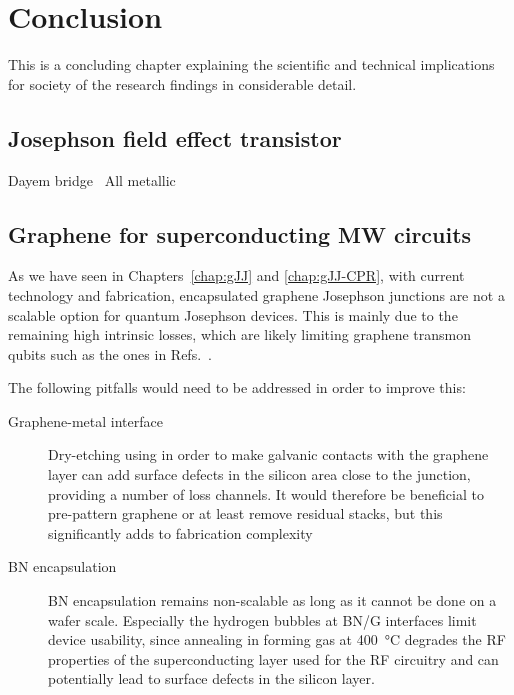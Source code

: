 \newchapstyle
\chapter{Conclusion}
\label{chap:conclusion}

\afterpage{\pagecolor{none}}\newpage
This is a concluding chapter explaining the scientific and technical
implications for society of the research findings in considerable detail.

\section{Josephson field effect transistor}

Dayem bridge~\cite{paolucciMagnetotransportExperimentsFully2019}
All metallic~\cite{desimoniMetallicSupercurrentFieldeffect2018}
\section{Graphene for superconducting MW circuits}

As we have seen in Chapters~\ref{chap:gJJ} and \ref{chap:gJJ-CPR}, with current technology and fabrication, encapsulated graphene Josephson junctions are not a scalable option for quantum Josephson devices.
%
This is mainly due to the remaining high intrinsic losses, which are likely limiting graphene transmon qubits such as the ones in Refs.~\cite{krollMagneticFieldCompatible2018,wangCoherentControlHybrid2019}.

The following pitfalls would need to be addressed in order to improve this:
\begin{description}
	\item[Graphene-metal interface] Dry-etching using  in order to make galvanic contacts with the graphene layer can add surface defects in the silicon area close to the junction, providing a number of loss channels.
	It would therefore be beneficial to pre-pattern graphene or at least remove residual stacks, but this significantly adds to fabrication complexity
	\item[BN encapsulation] BN encapsulation remains non-scalable as long as it cannot be done on a wafer scale.
	Especially the hydrogen bubbles at BN/G interfaces limit device usability, since annealing in forming gas at \SI{400}{\celsius} degrades the RF properties of the superconducting layer used for the RF circuitry and can potentially lead to surface defects in the silicon layer.
\end{description}

